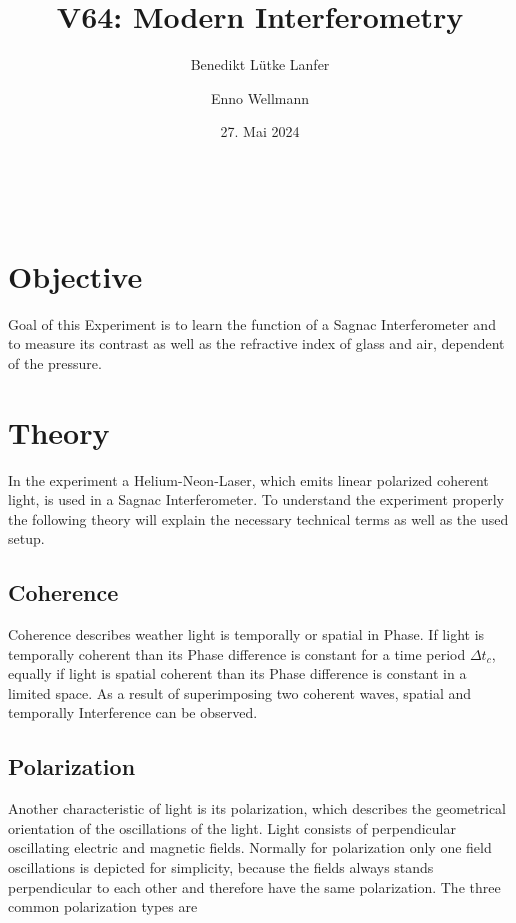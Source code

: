 

\title{V64: Modern Interferometry}
\author{Benedikt Lütke Lanfer \and Enno Wellmann}
\date{27. Mai 2024}
\publishers{TU Dortmund – Fakultät Physik}



\tableofcontents
\newpage
\let\t\text\

% 
\section{Objective}
Goal of this Experiment is to learn the function of a Sagnac Interferometer and
to measure its contrast as well as the refractive index of glass and air,
dependent of the pressure.


\section{Theory}
In the experiment a Helium-Neon-Laser, which emits linear polarized coherent
light, is used in a Sagnac Interferometer. To understand the experiment
properly the following theory will explain the necessary technical terms as
well as the used setup.

\subsection{Coherence}
Coherence describes weather light is temporally or spatial in Phase. If light
is temporally coherent than its Phase difference is constant for a time period
$\Delta t_c$, equally if light is spatial coherent than its Phase difference is
constant in a limited space. As a result of superimposing two coherent waves,
spatial and temporally Interference can be observed.

\subsection{Polarization}
Another characteristic of light is its polarization, which describes the
geometrical orientation of the oscillations of the light. Light consists of
perpendicular oscillating electric and magnetic fields. Normally for
polarization only one field oscillations is depicted for simplicity, because
the fields always stands perpendicular to each other and therefore have the
same polarization. The three common polarization types are

